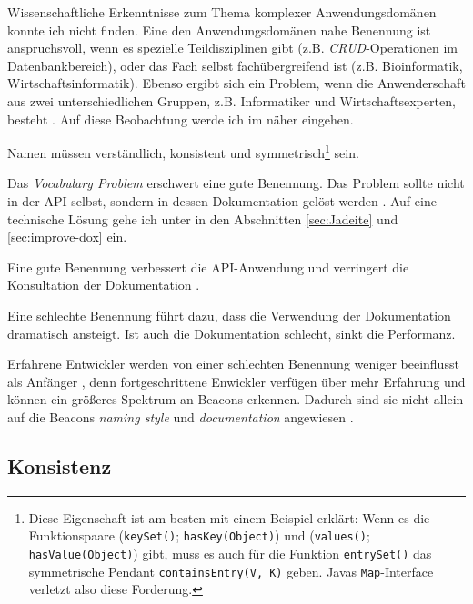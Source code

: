 Wissenschaftliche Erkenntnisse zum Thema komplexer Anwendungsdomänen konnte ich nicht finden. Eine den Anwendungsdomänen nahe Benennung ist anspruchsvoll, wenn es spezielle Teildisziplinen gibt (z.B. \textit{CRUD}-Operationen im Datenbankbereich), oder das Fach selbst fachübergreifend ist (z.B. Bioinformatik, Wirtschaftsinformatik). Ebenso ergibt sich ein Problem, wenn die Anwenderschaft aus zwei unterschiedlichen Gruppen, z.B. Informatiker und Wirtschaftsexperten, besteht \citep{Jeong:kf}. Auf diese Beobachtung werde ich im  näher eingehen.

Namen müssen verständlich, konsistent \citep[auch ][]{Briand:1997fw,Zibran:2011fx,McLellan:1998cu} und symmetrisch\footnote{Diese Eigenschaft ist am besten mit einem Beispiel erklärt: Wenn es die Funktionspaare (\texttt{keySet()}; \texttt{hasKey(Object)}) und (\texttt{values()}; \texttt{hasValue(Object)}) gibt, muss es auch für die Funktion \texttt{entrySet()} das symmetrische Pendant \texttt{containsEntry(V, K)} geben. Javas \texttt{Map}-Interface verletzt also diese Forderung.} sein. \citep{Bloch:2006jk}

Das \textit{Vocabulary Problem} \citep{Good:1984kr,Furnas:1987hl} erschwert eine gute Benennung. Das Problem sollte nicht in der API selbst, sondern in dessen Dokumentation gelöst werden \citep{Stylos:2009gc}. Auf eine technische Lösung gehe ich unter in den Abschnitten \ref{sec:Jadeite} und \ref{sec:improve-dox} ein.

Eine gute Benennung verbessert die API-Anwendung \citep{Bloch:2005wn} und verringert die Konsultation der Dokumentation \citep{Blinman:2005wr}.

Eine schlechte Benennung führt dazu, dass die Verwendung der Dokumentation dramatisch ansteigt. Ist auch die Dokumentation schlecht, sinkt die Performanz. \citep{Blinman:2005wr}

Erfahrene Entwickler werden von einer schlechten Benennung weniger beeinflusst als Anfänger \citep{Blinman:2005wr,Teasley:1994gr,Crosby02theroles}, denn fortgeschrittene Enwickler verfügen über mehr Erfahrung \citep{Teasley:1994gr} und können ein größeres Spektrum an Beacons erkennen. Dadurch sind sie nicht allein auf die Beacons \textit{naming style} und \textit{documentation} angewiesen \citep{Crosby02theroles}.



\subsection{Konsistenz}

